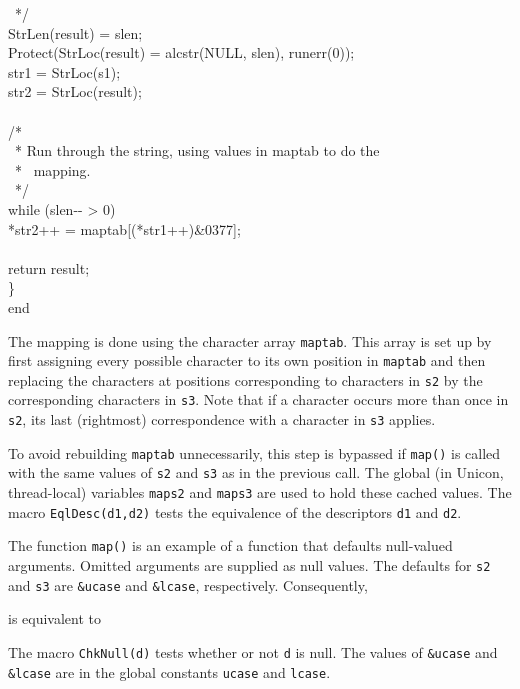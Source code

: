 \begin{iconcode}
\>\>\>\ */\\
\>\>\>StrLen(result) = slen;\\
\>\>\>Protect(StrLoc(result) = alcstr(NULL, slen), runerr(0));\\
\>\>\>str1 = StrLoc(s1);\\
\>\>\>str2 = StrLoc(result);\\
\\
\>\>\>/*\\
\>\>\>\ * Run through the string, using values in maptab to do the\\
\>\>\>\ * \ mapping.\\
\>\>\>\ */\\
\>\>\>while (slen-{}- > 0)\\
\>\>\>\>*str2++ = maptab[(*str1++)\&0377];\\
\\
\>\>\>return result;\\
\>\>\}\\
end
\end{iconcode}

The mapping is done using the character array \texttt{maptab}. This
array is set up by first assigning every possible character to its own
position in \texttt{maptab} and then replacing the characters at
positions corresponding to characters in \texttt{s2} by the
corresponding characters in \texttt{s3}. Note that if a character
occurs more than once in \texttt{s2}, its last (rightmost)
correspondence with a character in \texttt{s3} applies.

To avoid rebuilding \texttt{maptab} unnecessarily, this step is
bypassed if \texttt{map()} is called with the same values of
\texttt{s2} and \texttt{s3} as in the previous call. The global
{\color{blue} (in Unicon, thread-local)}
variables \texttt{maps2} and \texttt{maps3} are used to hold these
{\textquotedbl}cached{\textquotedbl} values. The macro
\texttt{EqlDesc(d1,d2)} tests the equivalence of the descriptors
\texttt{d1} and \texttt{d2}.

The function \texttt{map()} is an example of a function that defaults
null-valued arguments. Omitted arguments are supplied as null
values. The defaults for \texttt{s2} and \texttt{s3} are
\texttt{\&ucase} and \texttt{\&lcase}, respectively. Consequently,


\noindent
is equivalent to


The macro \texttt{ChkNull(d)} tests whether or not \texttt{d} is
null. The values of \texttt{\&ucase} and \texttt{\&lcase} are in the
global constants \texttt{ucase} and \texttt{lcase}.

